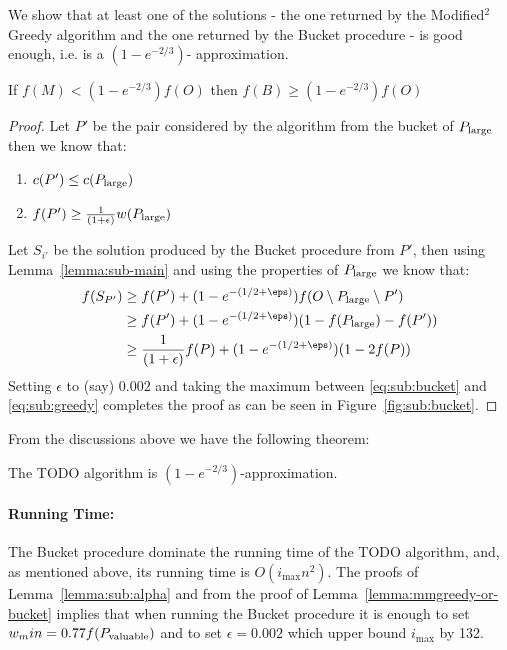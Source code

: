 We show that at least one of the solutions - the one returned by the Modified$^2$ Greedy algorithm and the one returned by the Bucket procedure - is good enough, i.e. is a $(1 - e^{-2/3})$- approximation.

\begin{lemma}
	\label{lemma:mmgreedy-or-bucket}
	If $f(M) < (1 - e^{-2/3})f(O)$ then $f(B) \geq (1 - e^{-2/3})f(O)$
\end{lemma}

\begin{proof}
	Let $P'$ be the pair considered by the algorithm from the bucket of $P_{\text{large}}$ then we know that:
	\begin{enumerate}
		\item $c(P') \leq c(P_{\text{large}})$
		\item $f(P') \geq \frac{1}{(1 + \epsilon)}w(P_{\text{large}})$
	\end{enumerate}
	Let $S_{i'}$ be the solution produced by the Bucket procedure from $P'$,
	then using Lemma~\ref{lemma:sub-main} and using the properties of $P_{\text{large}}$ we know that:
	\begin{align}
		f(S_{P'}) 
		& 
		\geq f(P') + (1-e^{-(1/2 + \eps)})f(O \setminus \pLarge \setminus P')
		\\ & 
		\geq f(P') + (1-e^{-(1/2 + \eps)})(1 - f(\pLarge) - f(P'))
		\\ & 
		\geq \frac{1}{(1 + \epsilon)}f(P) + (1-e^{-(1/2 + \eps)})(1 - 2f(P))
		\label{eq:sub:bucket}
	\end{align}
	Setting $\epsilon$ to (say) $0.002$ and taking the maximum between \ref{eq:sub:bucket} and
	\ref{eq:sub:greedy} completes the proof as can be seen in Figure~\ref{fig:sub:bucket}.
\end{proof}

From the discussions above we have the following theorem:

\begin{theorem}
	The TODO algorithm is $(1 - e^{-2/3})$-approximation.
\end{theorem}

\paragraph{Running Time:}
The Bucket procedure dominate the running time of the TODO algorithm, and, as mentioned above, its running time is $O(i_{\max}n^2)$.
The proofs of Lemma~\ref{lemma:sub:alpha} and from the proof of Lemma~\ref{lemma:mmgreedy-or-bucket} implies that when running the Bucket procedure it is enough to set $w_min = 0.77f(P_{\text{valuable}})$ and to set $\epsilon = 0.002$ which upper bound $i_{\max}$ by 132.

